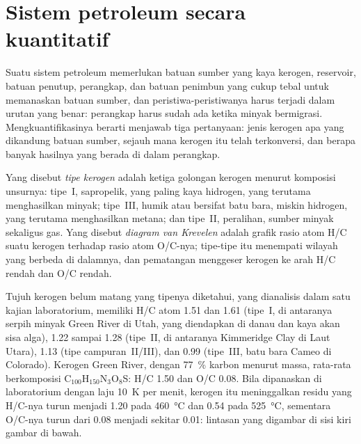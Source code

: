 \section{Sistem petroleum secara kuantitatif}\label{sec:b2:energy-geology:petroleum}

Suatu sistem petroleum memerlukan batuan sumber yang kaya kerogen, reservoir, batuan penutup, perangkap, dan batuan penimbun
yang cukup tebal untuk memanaskan batuan sumber, dan peristiwa-peristiwanya harus terjadi dalam urutan yang benar: perangkap harus
sudah ada ketika minyak bermigrasi. Mengkuantifikasinya berarti menjawab tiga pertanyaan: jenis kerogen apa
yang dikandung batuan sumber, sejauh mana kerogen itu telah terkonversi, dan berapa banyak hasilnya yang berada di dalam
perangkap.

\begin{definition}\label{def:b2:energy-geology:kerogen}
Yang disebut \emph{tipe kerogen} adalah ketiga golongan kerogen menurut komposisi unsurnya:
tipe~I, sapropelik, yang paling kaya hidrogen, yang terutama menghasilkan minyak; tipe~III, humik atau bersifat batu bara,
miskin hidrogen, yang terutama menghasilkan metana; dan tipe~II, peralihan, sumber minyak sekaligus
gas. Yang disebut \emph{diagram van Krevelen} adalah grafik rasio atom H/C
suatu kerogen terhadap rasio atom O/C-nya; tipe-tipe itu menempati wilayah yang berbeda di dalamnya, dan pematangan
menggeser kerogen ke arah H/C rendah dan O/C rendah.
\end{definition}

Tujuh kerogen belum matang yang tipenya diketahui, yang dianalisis dalam satu kajian laboratorium, memiliki H/C atom
1.51 dan 1.61 (tipe~I, di antaranya serpih minyak Green River di Utah, yang diendapkan di danau dan kaya akan
sisa alga), 1.22 sampai 1.28 (tipe~II, di antaranya Kimmeridge Clay di Laut Utara),
1.13 (tipe campuran~II/III), dan 0.99 (tipe~III, batu bara Cameo di Colorado). Kerogen Green
River, dengan \qty{77}{\percent} karbon menurut massa, rata-rata berkomposisi C$_{100}$H$_{150}$N$_3$O$_8$S: H/C 1.50 dan
O/C 0.08. Bila dipanaskan di laboratorium dengan laju \qty{10}{K} per menit, kerogen itu meninggalkan residu yang H/C-nya turun menjadi
1.20 pada \qty{460}{\celsius} dan 0.54 pada \qty{525}{\celsius}, sementara O/C-nya turun dari 0.08 menjadi sekitar
0.01: lintasan yang digambar di sisi kiri gambar di bawah.


